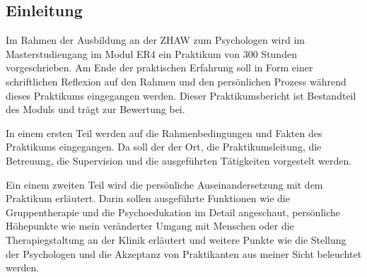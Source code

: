 \subsection{Einleitung} \label{sec:Einleitung}
Im Rahmen der Ausbildung an der ZHAW zum Psychologen wird im Masterstudiengang im Modul ER4  ein Praktikum von 300 Stunden vorgeschrieben. Am Ende der praktischen Erfahrung soll in Form einer schriftlichen Reflexion auf den Rahmen und den persönlichen Prozess während dieses Praktikums eingegangen werden. Dieser Praktikumsbericht ist Bestandteil des Moduls und trägt zur Bewertung bei. 

In einem ersten Teil werden auf die Rahmenbedingungen und Fakten des Praktikums eingegangen. Da soll der der Ort, die Praktikumsleitung, die Betreuung, die Supervision und die ausgeführten Tätigkeiten vorgestelt werden.

Ein einem zweiten Teil wird die persönliche Auseinandersetzung mit dem Praktikum erläutert. Darin sollen ausgeführte Funktionen wie die Gruppentherapie und die Psychoedukation im Detail angeschaut, persönliche Höhepunkte wie mein veränderter Umgang mit Menschen oder die Therapiegstaltung an der Klinik erläutert und weitere Punkte wie die Stellung der Psychologen und die Akzeptanz von Praktikanten aus meiner Sicht beleuchtet werden.





